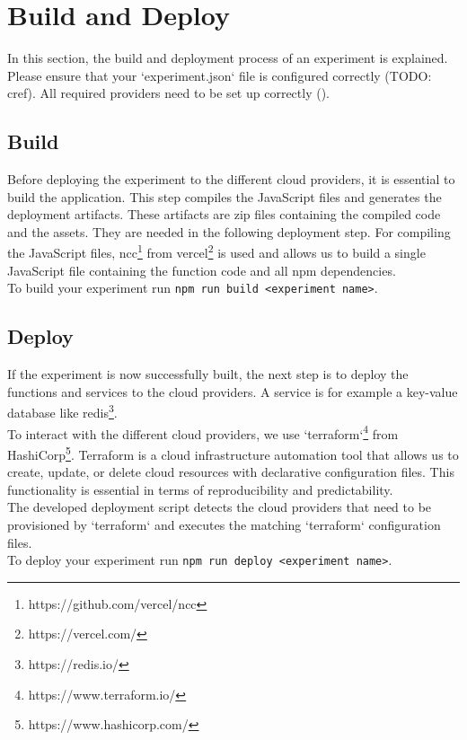 \documentclass[../main.tex]{subfiles}
\begin{document}
\section{Build and Deploy}\label{sec:buildanddeploy}
In this section, the build and deployment process of an experiment is explained. Please ensure that your `experiment.json` file is configured correctly (TODO: cref). All required providers need to be set up correctly ().

\subsection{Build}\label{sec:build}
Before deploying the experiment to the different cloud providers, it is essential to build the application. This step compiles the JavaScript files and generates the deployment artifacts. These artifacts are zip files containing the compiled code and the assets. They are needed in the following deployment step. For compiling the JavaScript files, ncc\footnote{https://github.com/vercel/ncc} from vercel\footnote{https://vercel.com/} is used and allows us to build a single JavaScript file containing the function code and all npm dependencies.\\
To build your experiment run \texttt{npm run build <experiment name>}.

\subsection{Deploy}\label{sec:deploy}
If the experiment is now successfully built, the next step is to deploy the functions and services to the cloud providers. A service is for example a key-value database like redis\footnote{https://redis.io/}. \\
To interact with the different cloud providers, we use `terraform`\footnote{https://www.terraform.io/} from HashiCorp\footnote{https://www.hashicorp.com/}. Terraform is a cloud infrastructure automation tool that allows us to create, update, or delete cloud resources with declarative configuration files. This functionality is essential in terms of reproducibility and predictability.\\
The developed deployment script detects the cloud providers that need to be provisioned by `terraform` and executes the matching `terraform` configuration files.\\
To deploy your experiment run \texttt{npm run deploy <experiment name>}.
\end{document}
